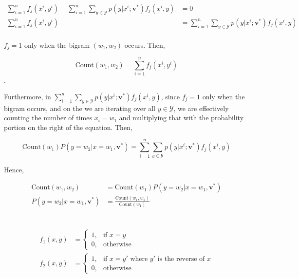 \documentclass[11pt]{scrartcl}
\newcommand{\vstar}{\ensuremath{\mathbf{v}^*}}
\newcommand{\n}[1]{\ensuremath{\text{#1}}}
\begin{document}
\begin{align*}
\sum_{i=1}^{n} f_j \left(x^i, y^i \right) - \sum_{i=1}^{n} \sum_{y \in \mathcal{Y}} p\left(y | x^i; \vstar \right) f_j \left(x^i, y\right) &= 0 \\
\sum_{i=1}^{n} f_j \left(x^i, y^i \right) &= \sum_{i=1}^{n} \sum_{y \in \mathcal{Y}} p\left(y | x^i; \vstar \right) f_j \left(x^i, y\right) \\ 
\end{align*}

$f_j = 1$ only when the bigram $\left(w_1, w_2\right)$ occurs. Then, 

\[ \text{Count}\left(w_1, w_2\right) = \sum_{i=1}^{n} f_j \left(x^i, y^i \right)\]. 

Furthermore, in $\sum_{i=1}^{n} \sum_{y \in \mathcal{Y}} p\left(y | x^i; \vstar \right) f_j \left(x^i, y\right)$, since $f_j=1$ only when the bigram occurs, and on the we are iterating over all $y \in \mathcal{Y}$, we are effectively counting the number of times $x_i = w_1$ and  multiplying that with the probability portion on the right of the equation. Then,

\[ \text{Count}\left(w_1\right) P\left(y = w_2 | x = w_1, \vstar\right) = \sum_{i=1}^{n} \sum_{y \in \mathcal{Y}} p\left(y | x^i; \vstar \right) f_j \left(x^i, y\right) \] 

Hence,

\begin{align*}
\text{Count}\left(w_1, w_2\right) &= \text{Count}\left(w_1\right) P\left(y = w_2 | x = w_1, \vstar\right) \\
P\left(y = w_2 | x = w_1, \vstar\right) &= \frac{\text{Count}\left(w_1, w_2\right)}{\text{Count}\left(w_1\right)}
\end{align*}


\section{}

\subsection{}

\begin{align*}
f_1(x,y) &= \begin{cases}
1,& \n{if } x = y \\
0,& \n{otherwise}
\end{cases} \\ 
f_2(x,y) &= \begin{cases}
1,& \n{if } x = y' \n{ where } y' \n{ is the reverse of } x\\
0,& \n{otherwise}
\end{cases}
\end{align*}
\end{document}
